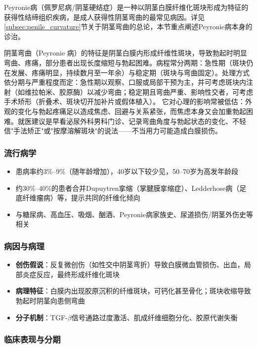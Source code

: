 Peyronie病（佩罗尼病/阴茎硬结症）是一种以阴茎白膜纤维化斑块形成为特征的获得性结缔组织疾病，是成人获得性阴茎弯曲的最常见病因。详见\ref{subsec:penile_curvature}节关于阴茎弯曲的总论，本节重点阐述Peyronie病本身的诊治。


阴茎弯曲（Peyronie 病）的特征是阴茎白膜内形成纤维性斑块，导致勃起时明显弯曲、疼痛，部分患者出现长度缩短与勃起困难。病程常分两期：急性期（斑块仍在发展、疼痛明显，持续数月至一年余）与稳定期（斑块与弯曲固定）。处理方式依分期与严重程度而定：急性期以观察、口服或局部干预为主，并可考虑斑块内注射（如维拉帕米、胶原酶）以减少弯曲；稳定期且弯曲严重、影响性交者，可考虑手术矫形（折叠术、斑块切开加补片或假体植入）。
它对心理的影响常被低估：外观的变化与勃起疼痛足以造成焦虑、回避与关系紧张，而焦虑本身又会加重勃起困难。就医建议是早看泌尿外科男科门诊、记录弯曲角度与勃起状态的变化、不轻信"手法矫正"或"按摩溶解斑块"的说法——不当用力可能造成白膜损伤。

\subsubsection{流行病学}

\begin{itemize}[leftmargin=2cm]
	\item 患病率约3\%--9\%（随年龄增加），40岁以下较少见，50--70岁为高发年龄段
	\item 约30\%--40\%的患者合并Dupuytren挛缩（掌腱膜挛缩症）、Ledderhose病（足底纤维瘤病）等，提示共同的纤维化倾向
	\item 与糖尿病、高血压、吸烟、酗酒、Peyronie病家族史、尿道损伤/阴茎外伤史等相关
\end{itemize}

\subsubsection{病因与病理}

\begin{itemize}[leftmargin=2cm]
	\item \textbf{创伤假说}：反复微创伤（如性交中阴茎弯折）导致白膜微血管损伤、出血，局部炎症反应，最终形成纤维化斑块
	\item \textbf{病理特征}：白膜内出现胶原沉积的纤维斑块，可钙化甚至骨化；斑块收缩导致勃起时阴茎向患侧弯曲
	\item \textbf{分子机制}：TGF-$\beta$信号通路过度激活、肌成纤维细胞分化、胶原代谢失衡
\end{itemize}

\subsubsection{临床表现与分期}

